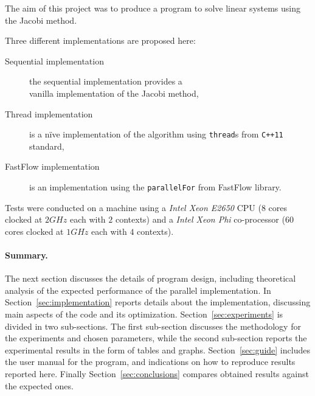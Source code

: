 The aim of this project was to produce a program to solve linear systems using the Jacobi method.

Three different implementations are proposed here:
\begin{description}
    \item[Sequential implementation] the sequential implementation provides a \\    
    vanilla implementation of the Jacobi method,
    \item[Thread implementation] is a n\"ive implementation of the algorithm using \lstinline+thread+s from \lstinline|C++11| standard,  
    \item[FastFlow implementation] is an implementation using the \lstinline+parallelFor+ from FastFlow library.
\end{description}

Tests were conducted on a machine using a \emph{Intel Xeon E2650} CPU ($8$ cores clocked at $2 GHz$ each with $2$ contexts) and a \emph{Intel Xeon Phi} co-processor ($60$ cores clocked at $1 GHz$ each with $4$ contexts).

\paragraph{Summary.} The next section discusses the details of program design, including theoretical analysis of the expected performance of the parallel implementation.
In Section~\ref{sec:implementation} reports details about the implementation, discussing main aspects of the code and its optimization.
Section~\ref{sec:experiments} is divided in two sub-sections. 
The first sub-section discusses the methodology for the experiments and chosen parameters, while the second sub-section reports the experimental results in the form of tables and graphs.
Section~\ref{sec:guide} includes the user manual for the program, and indications on how to reproduce results reported here.
Finally Section~\ref{sec:conclusions} compares obtained results against the expected ones.